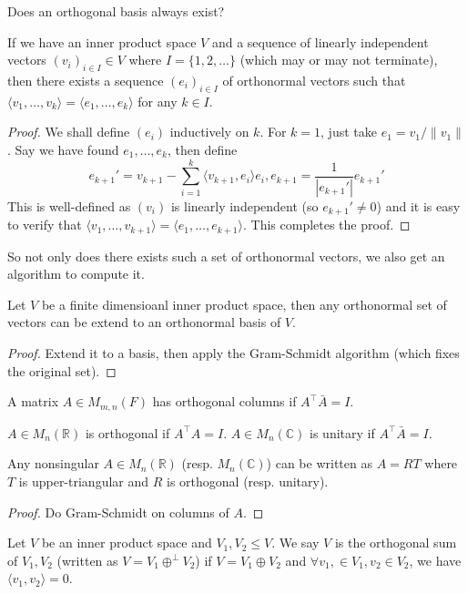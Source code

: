 Does an orthogonal basis always exist?
\begin{theorem}
    If we have an inner product space $V$ and a sequence of linearly independent vectors $(v_i)_{i\in I}\in V$ where $I=\{1,2,\ldots\}$ (which may or may not terminate), then there exists a sequence $(e_i)_{i\in I}$ of orthonormal vectors such that $\langle v_1,\ldots,v_k\rangle=\langle e_1,\ldots,e_k\rangle$ for any $k\in I$.
\end{theorem}
\begin{proof}
    We shall define $(e_i)$ inductively on $k$.
    For $k=1$, just take $e_1=v_1/\|v_1\|$.
    Say we have found $e_1,\ldots,e_k$, then define
    $$e_{k+1}'=v_{k+1}-\sum_{i=1}^k\langle v_{k+1},e_i\rangle e_i,e_{k+1}=\frac{1}{|e_{k+1}'|}e_{k+1}'$$
    This is well-defined as $(v_i)$ is linearly independent (so $e_{k+1}'\neq 0$) and it is easy to verify that $\langle v_1,\ldots,v_{k+1}\rangle=\langle e_1,\ldots,e_{k+1}\rangle$.
    This completes the proof.
\end{proof}
So not only does there exists such a set of orthonormal vectors, we also get an algorithm to compute it.
\begin{corollary}
    Let $V$ be a finite dimensioanl inner product space, then any orthonormal set of vectors can be extend to an orthonormal basis of $V$.
\end{corollary}
\begin{proof}
    Extend it to a basis, then apply the Gram-Schmidt algorithm (which fixes the original set).
\end{proof}
\begin{note}
    A matrix $A\in M_{m,n}(F)$ has orthogonal columns if $A^\top\bar{A}=I$.
\end{note}
\begin{definition}
    $A\in M_n(\mathbb R)$ is orthogonal if $A^\top A=I$.
    $A\in M_n(\mathbb C)$ is unitary if $A^\top\bar{A}=I$.
\end{definition}
\begin{proposition}
    Any nonsingular $A\in M_n(\mathbb R)$ (resp. $M_n(\mathbb C)$) can be written as $A=RT$ where $T$ is upper-triangular and $R$ is orthogonal (resp. unitary).
\end{proposition}
\begin{proof}
    Do Gram-Schmidt on columns of $A$.
\end{proof}
\begin{definition}
    Let $V$ be an inner product space and $V_1,V_2\le V$.
    We say $V$ is the orthogonal sum of $V_1,V_2$ (written as $V=V_1\oplus^\perp V_2$) if $V=V_1\oplus V_2$ and $\forall v_1,\in V_1,v_2\in V_2$, we have $\langle v_1,v_2\rangle=0$.
\end{definition}
